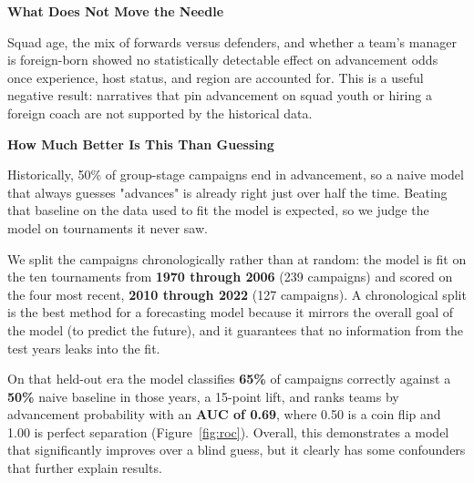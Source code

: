 \documentclass{article}
\begin{document}
\vspace{0.8em}


\vspace{1.2em}

\textbf{\large What Does Not Move the Needle}

Squad age, the mix of forwards versus defenders, and whether a team's manager
is foreign-born showed no statistically detectable effect on advancement odds
once experience, host status, and region are accounted for. This is a useful
negative result: narratives that pin advancement on squad youth or hiring a
foreign coach are not supported by the historical data.

\vspace{1.2em}
\clearpage

\textbf{\large How Much Better Is This Than Guessing}

Historically, 50\% of group-stage campaigns end in advancement, so a naive
model that always guesses "advances" is already right just over half the
time. Beating that baseline on the data used to fit the model is expected, so we
judge the model on tournaments it never saw.

We split the campaigns chronologically rather than at random: the model is fit
on the ten tournaments from \textbf{1970 through 2006} (239 campaigns) and
scored on the four most recent, \textbf{2010 through 2022} (127 campaigns).
A chronological split is the best method for a forecasting model because it
mirrors the overall goal of the model (to predict the future), and it guarantees that no information from
the test years leaks into the fit. 

On that held-out era the model classifies \textbf{65\%} of campaigns correctly
against a \textbf{50\%} naive baseline in those years, a 15-point lift, and
ranks teams by advancement probability with an \textbf{AUC of 0.69}, where
0.50 is a coin flip and 1.00 is perfect separation (Figure~\ref{fig:roc}). Overall, this demonstrates a model that significantly improves over a blind guess, but it clearly has some confounders that further explain results. 


\vspace{1.2em}
\end{document}
